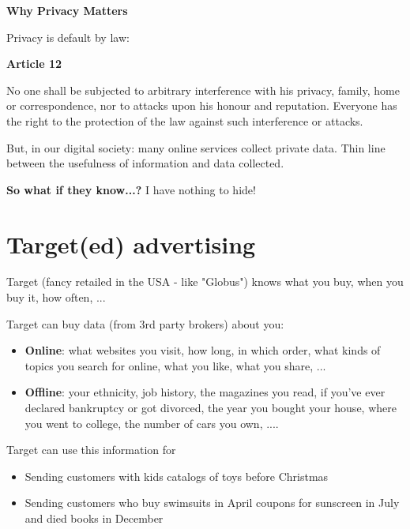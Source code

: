 \documentclass[11pt]{article}
\begin{document}
\newpage

\begin{center}
  {\LARGE \textbf{Why Privacy Matters}}
\end{center}
\vspace{0.5cm}

Privacy is default by law:

\begin{tcolorbox}[
  colback=gray!15,     %
  colframe=black!50,    %
  boxrule=1pt,       %
  arc=3mm,             %
  left=4mm, right=4mm, top=2mm, bottom=2mm %
]
\textbf{Article 12}

\vspace{0.3cm}

No one shall be subjected to arbitrary interference with his privacy, family, home or correspondence, nor to attacks upon his honour and reputation. Everyone has the right to the protection of the law against such interference or attacks.
\end{tcolorbox}

But, in our digital society: many online services collect private data. Thin line between the usefulness of information and data collected.

\textbf{So what if they know...?} I have nothing to hide!

\section*{Target(ed) advertising}

Target (fancy retailed in the USA - like "Globus") knows what you buy, when you buy it, how often, ...

Target can buy data (from 3rd party brokers) about you:
\begin{itemize}
	\item \textbf{Online}: what websites you visit, how long, in which order, what kinds of topics you search for online, what you like, what you share, ...
	\item \textbf{Offline}: your ethnicity, job history, the magazines you read, if you've ever declared bankruptcy or got divorced, the year you bought your house, where you went to college, the number of cars you own, ....
\end{itemize}

Target can use this information for
\begin{itemize}
	\item Sending customers with kids catalogs of toys before Christmas
	\item Sending customers who buy swimsuits in April coupons for sunscreen in July and died books in December
\end{itemize}
\end{document}
